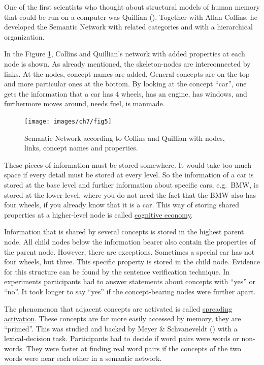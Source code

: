 \documentclass[
]{krantz}
\begin{document}
One of the first scientists who thought about structural models of human memory that could be run on a computer was Quillian (). Together with Allan Collins, he developed the Semantic Network with related categories and with a hierarchical organization.

In the Figure \ref{fig:network}, Collins and Quillian's network with added properties at each node is shown. As already mentioned, the skeleton-nodes are interconnected by links. At the nodes, concept names are added. General concepts are on the top and more particular ones at the bottom. By looking at the concept ``car'', one gets the information that a car has 4 wheels, has an engine, has windows, and furthermore moves around, needs fuel, is manmade.

\begin{figure}

{\centering \texttt{[image: images/ch7/fig5]} 

}

\caption{Semantic Network according to Collins and Quillian with nodes, links, concept names and properties. }\label{fig:network}
\end{figure}

These pieces of information must be stored somewhere. It would take too much space if every detail must be stored at every level. So the information of a car is stored at the base level and further information about specific cars, e.g.~BMW, is stored at the lower level, where you do not need the fact that the BMW also has four wheels, if you already know that it is a car. This way of storing shared properties at a higher-level node is called \hyperref[cognitive-economy]{cognitive economy}.

Information that is shared by several concepts is stored in the highest parent node. All child nodes below the information bearer also contain the properties of the parent node. However, there are exceptions. Sometimes a special car has not four wheels, but three. This specific property is stored in the child node. Evidence for this structure can be found by the sentence verification technique. In experiments participants had to answer statements about concepts with ``yes'' or ``no''. It took longer to say ``yes'' if the concept-bearing nodes were further apart.

The phenomenon that adjacent concepts are activated is called \hyperref[spreading-activation]{spreading activation}. These concepts are far more easily accessed by memory, they are ``primed''. This was studied and backed by Meyer \& Schvaneveldt () with a lexical-decision task. Participants had to decide if word pairs were words or non-words. They were faster at finding real word pairs if the concepts of the two words were near each other in a semantic network.
\end{document}
